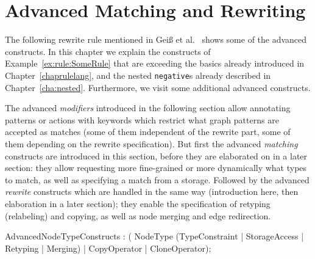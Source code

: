 \chapter{Advanced Matching and Rewriting}
\label{chapadvanced}

The following rewrite rule mentioned in Geiß et al.~\cite{GBGHS:06} shows some of the advanced constructs.
In this chapter we explain the constructs of Example~\ref{ex:rule:SomeRule} that are exceeding the basics already introduced in Chapter~\ref{chaprulelang}, and the nested \texttt{negative}s already described in Chapter~\ref{cha:nested}.
Furthermore, we visit some additional advanced constructs.

\begin{example}\label{ex:rule:SomeRule}
\end{example}

The advanced \emph{modifiers} introduced in the following section allow annotating patterns or actions with keywords which restrict what graph patterns are accepted as matches (some of them independent of the rewrite part, some of them depending on the rewrite specification).
But first the advanced \emph{matching} constructs are introduced in this section, before they are elaborated on in a later section:
they allow requesting more fine-grained or more dynamically what types to match, as well as specifying a match from a storage.
Followed by the advanced \emph{rewrite} constructs which are handled in the same way (introduction here, then elaboration in a later section);
they enable the specification of retyping (relabeling) and copying, as well as node merging and edge redirection.

\begin{rail}
AdvancedNodeTypeConstructs : ( NodeType (TypeConstraint | StorageAccess | Retyping | Merging) | CopyOperator | CloneOperator);
\end{rail}


